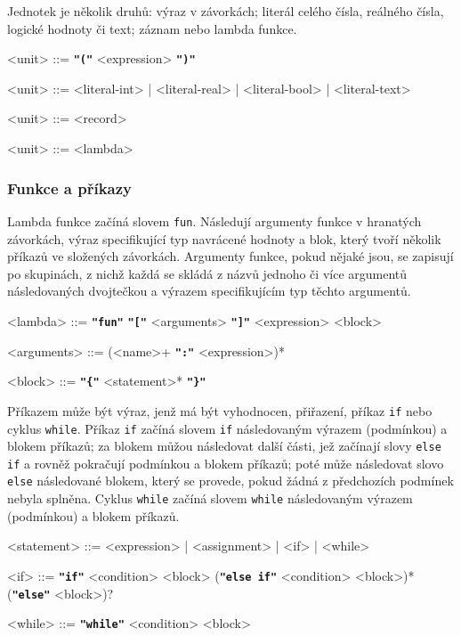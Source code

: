 \documentclass[a4paper,12pt]{article}
\def\quote #1{"#1"}
\def\emphasis #1{\textbf{\texttt{\quote{#1}}}}
\begin{document}
Jednotek je několik druhů: výraz v závorkách; literál celého čísla, reálného čísla, logické hodnoty či text; záznam nebo lambda funkce.
\begin{grammar}
<unit> ::= \emphasis{(} <expression> \emphasis{)}

<unit> ::= <literal-int> | <literal-real> | <literal-bool> | <literal-text>

<unit> ::= <record>

<unit> ::= <lambda>
\end{grammar}

\subsubsection{Funkce a příkazy}
Lambda funkce začíná slovem \texttt{fun}. Následují argumenty funkce v hranatých závorkách, výraz specifikující typ navrácené hodnoty a blok, který tvoří několik příkazů ve složených závorkách. Argumenty funkce, pokud nějaké jsou, se zapisují po skupinách, z nichž každá se skládá z názvů jednoho či více argumentů následovaných dvojtečkou a výrazem specifikujícím typ těchto argumentů.
\begin{grammar}
<lambda> ::= \emphasis{fun} \emphasis{[} <arguments> \emphasis{]} <expression> <block>

<arguments> ::= (<name>+ \emphasis{:} <expression>)*

<block> ::= \emphasis{\{} <statement>* \emphasis{\}}
\end{grammar}

Příkazem může být výraz, jenž má být vyhodnocen, přiřazení, příkaz \texttt{if} nebo cyklus \texttt{while}. Příkaz \texttt{if} začíná slovem \texttt{if} následovaným výrazem (podmínkou) a blokem příkazů; za blokem můžou následovat další části, jež začínají slovy \texttt{else if} a rovněž pokračují podmínkou a blokem příkazů; poté může následovat slovo \texttt{else} následované blokem, který se provede, pokud žádná z předchozích podmínek nebyla splněna. Cyklus \texttt{while} začíná slovem \texttt{while} následovaným výrazem (podmínkou) a blokem příkazů.
\begin{grammar}
<statement> ::= <expression> | <assignment> | <if> | <while>

<if> ::= \emphasis{if} <condition> <block> (\emphasis{else if} <condition> <block>)* (\emphasis{else} <block>)?

<while> ::= \emphasis{while} <condition> <block>
\end{grammar}
\end{document}
